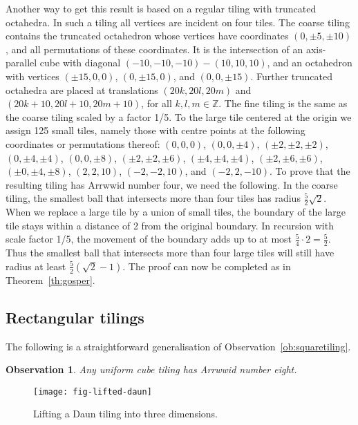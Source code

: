 \documentclass[11pt,a4paper]{article}
\newcommand{\Integers}{\mathbb{Z}}
\newcommand{\plmin}{\pm}
\newtheorem{observation}{Observation}
\begin{document}
Another way to get this result is based on a regular tiling with truncated octahedra. In such a tiling all vertices are incident on four tiles. The coarse tiling contains the truncated octahedron whose vertices have coordinates $(0, \plmin 5, \plmin 10)$, and all permutations of these coordinates. It is the intersection of an axis-parallel cube with diagonal $(-10,-10,-10)-(10,10,10)$, and an octahedron with vertices $(\plmin 15,0,0)$, $(0,\plmin 15,0)$, and $(0,0,\plmin 15)$. Further truncated octahedra are placed at translations $(20k,20l,20m)$ and $(20k+10,20l+10,20m+10)$, for all $k,l,m \in \Integers$. The fine tiling is the same as the coarse tiling scaled by a factor 1/5. To the large tile centered at the origin we assign 125 small tiles, namely those with centre points at the following coordinates or permutations thereof: $(0,0,0)$, $(0,0,\plmin 4)$, $(\plmin 2,\plmin 2,\plmin 2)$, $(0,\plmin 4,\plmin 4)$, $(0,0,\plmin 8)$, $(\plmin 2,\plmin 2, \plmin 6)$, $(\plmin 4,\plmin 4,\plmin 4)$, $(\plmin 2,\plmin 6,\plmin 6)$, $(\plmin 0,\plmin 4,\plmin 8)$, $(2,2,10)$, $(-2,-2,10)$, and $(-2,2,-10)$. To prove that the resulting tiling has Arrwwid number four, we need the following. In the coarse tiling, the smallest ball that intersects more than four tiles has radius $\frac52\sqrt 2$. When we replace a large tile by a union of small tiles, the boundary of the large tile stays within a distance of 2 from the original boundary. In recursion with scale factor 1/5, the movement of the boundary adds up to at most $\frac54 \cdot 2 = \frac52$. Thus the smallest ball that intersects more than four large tiles will still have radius at least $\frac52 (\sqrt{2} - 1)$. The proof can now be completed as in Theorem~\ref{th:gosper}.

\subsection{Rectangular tilings}

The following is a straightforward generalisation of Observation~\ref{ob:squaretiling}.
\begin{observation}\label{ob:cubetiling}
Any uniform cube tiling has Arrwwid number eight.
\end{observation}

\begin{figure}
\centering
\texttt{[image: fig-lifted-daun]}
\caption{Lifting a Daun tiling into three dimensions.}
\label{fig:lifted-daun}
\end{figure}
\end{document}
